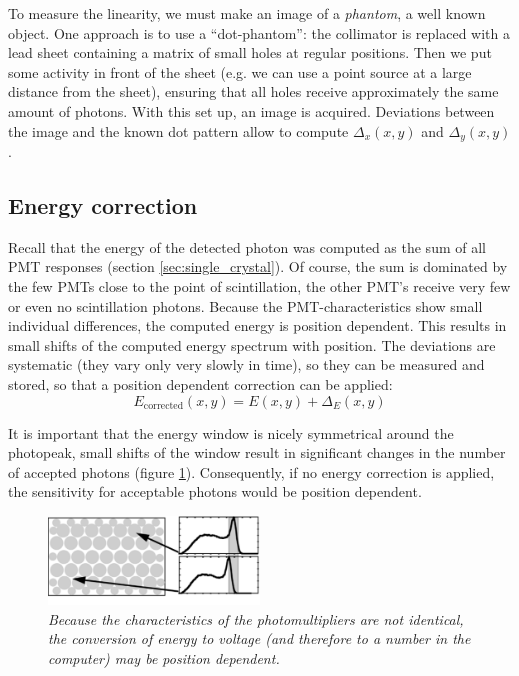 \documentclass[11pt,oneside]{book}
\begin{document}
To measure the linearity, we must make an image of a {\em phantom}, a well
known object. One approach is to use a ``dot-phantom'': the collimator is
replaced with a lead sheet containing a matrix of small holes at regular
positions. Then we put some activity in front of the sheet (e.g. we can use a
point source at a large distance from the sheet), ensuring that all holes
receive approximately the same amount of photons. With this set up, an image
is acquired. Deviations between the image and the known dot pattern allow to
compute $\Delta_x(x,y)$ and $\Delta_y(x,y)$.

\subsection{Energy correction}
Recall that the energy of the detected photon was computed as the sum of all
PMT responses (section \ref{sec:single_crystal}). Of course, the sum is
dominated by the few PMTs close to the point of scintillation, the other PMT's
receive very few or even no scintillation photons. Because the
PMT-characteristics show small individual differences, the computed energy is
position dependent. This results in small shifts of the computed energy
spectrum with position. The deviations are systematic (they vary only very
slowly in time), so they can be measured and stored, so that a position
dependent correction can be applied:
\begin{equation}
  E_{\mbox{corrected}}(x,y) = E(x,y) + \Delta_E(x,y)
\end{equation}

It is important that the energy window is nicely symmetrical around the
photopeak, small shifts of the window result in significant changes in the
number of accepted photons (figure \ref{fig:energy_corr}). Consequently, if no
energy correction is applied, the sensitivity for acceptable photons would be
position dependent.

\begin{figure}[tb]
\centering
\includegraphics[width=0.5\textwidth]{figs/fig_energy_corr.pdf}
\caption{\label{fig:energy_corr} \emph{Because the characteristics of the
photomultipliers are not identical, the conversion of energy to voltage (and
therefore to a number in the computer) may be position dependent.}}
\end{figure}
\end{document}
